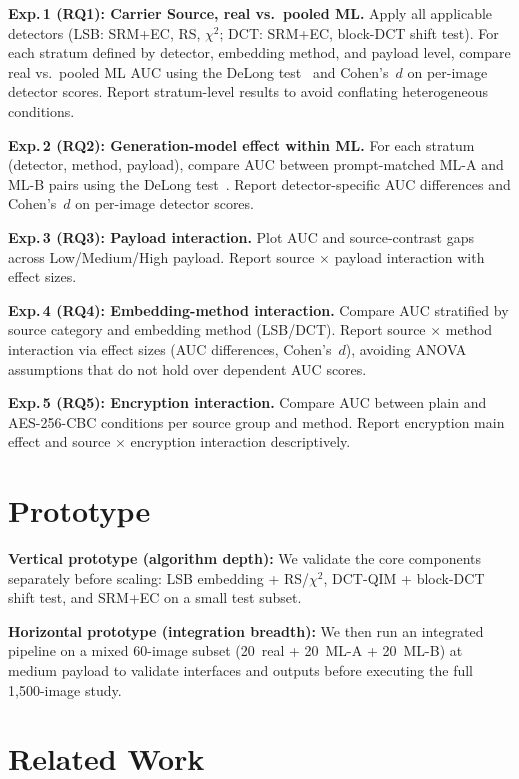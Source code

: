 \documentclass[10pt,twocolumn,a4paper]{article}
\begin{document}
\textbf{Exp.\,1 (RQ1): Carrier Source, real vs.\ pooled ML.} Apply all applicable detectors (LSB: SRM+EC, RS, $\chi^2$; DCT: SRM+EC, block-DCT shift test). For each stratum defined by detector, embedding method, and payload level, compare real vs.\ pooled ML AUC using the DeLong test~\cite{delong1988} and Cohen's~$d$ on per-image detector scores. Report stratum-level results to avoid conflating heterogeneous conditions.

\textbf{Exp.\,2 (RQ2): Generation-model effect within ML.} For each stratum (detector, method, payload), compare AUC between prompt-matched ML-A and ML-B pairs using the DeLong test~\cite{delong1988}. Report detector-specific AUC differences and Cohen's~$d$ on per-image detector scores.

\textbf{Exp.\,3 (RQ3): Payload interaction.} Plot AUC and source-contrast gaps across Low/Medium/High payload. Report source $\times$ payload interaction with effect sizes.

\textbf{Exp.\,4 (RQ4): Embedding-method interaction.} Compare AUC stratified by source category and embedding method (LSB/DCT). Report source $\times$ method interaction via effect sizes (AUC differences, Cohen's~$d$), avoiding ANOVA assumptions that do not hold over dependent AUC scores.

\textbf{Exp.\,5 (RQ5): Encryption interaction.} Compare AUC between plain and AES-256-CBC conditions per source group and method. Report encryption main effect and source $\times$ encryption interaction descriptively.


\section{Prototype}

\textbf{Vertical prototype (algorithm depth):} We validate the core components separately before scaling: LSB embedding + RS/$\chi^2$, DCT-QIM + block-DCT shift test, and SRM+EC on a small test subset.

\textbf{Horizontal prototype (integration breadth):} We then run an integrated pipeline on a mixed 60-image subset (20~real + 20~ML-A + 20~ML-B) at medium payload to validate interfaces and outputs before executing the full 1{,}500-image study.

\section{Related Work}
\end{document}
